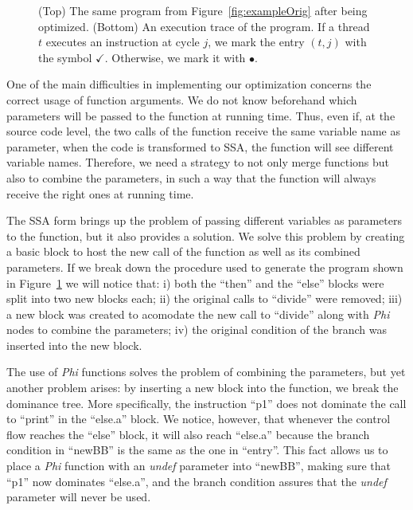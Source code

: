 \documentclass[times,10pt,twocolumn]{article}
\begin{document}
\begin{figure}[htb]
\begin{center}
\begin{small}
\end{small}
\end{center}
\caption{(Top) The same program from Figure~\ref{fig:exampleOrig} after being optimized.
(Bottom) An execution trace of the program.
If a thread $t$ executes an instruction at cycle
$j$, we mark the entry $(t, j)$ with the symbol $\checkmark$.
Otherwise, we mark it with $\bullet$.}
\label{fig:exampleOpt}
\end{figure}

One of the main difficulties in implementing our optimization concerns the
correct usage of function arguments.
We do not know beforehand which parameters
will be passed to the function at running time.
Thus, even if, at the source code level, the two calls of the function receive
the same variable name as parameter, when the code is transformed to SSA, the 
function will see different variable names.
Therefore, we need a strategy to not only merge functions but also to combine 
the parameters, in such a way that the function will always receive the right
ones at running time.

The SSA form brings up the problem of passing different variables as parameters
to the function, but it also provides a solution. 
We solve this problem by creating a basic block to host the new call of the 
function as well as its combined parameters. 
If we break down the procedure used to generate the program shown in 
Figure~\ref{fig:exampleOpt} we will notice that: i) both the ``then'' and
the ``else'' blocks were split into two new blocks each; ii) the original
calls to ``divide'' were removed; iii) a new block was created to acomodate
the new call to ``divide'' along with \textit{Phi} nodes to combine the
parameters; iv) the original condition of the branch was inserted into the
new block.

The use of \textit{Phi} functions solves the problem of combining the 
parameters, but yet another problem arises: by inserting a new block into the 
function, we break the dominance tree. 
More specifically, the instruction ``p1''
does not dominate the call to ``print'' in the ``else.a'' block. 
We notice, however, that whenever the control flow reaches the ``else'' block,
it will also reach ``else.a'' because the branch condition in ``newBB'' is the
same as the one in ``entry''. 
This fact allows us to place a \textit{Phi} function with an \textit{undef} 
parameter into ``newBB'', making sure that ``p1'' now dominates 
``else.a'', and the branch condition assures that the \textit{undef} parameter
will never be used.
\end{document}
